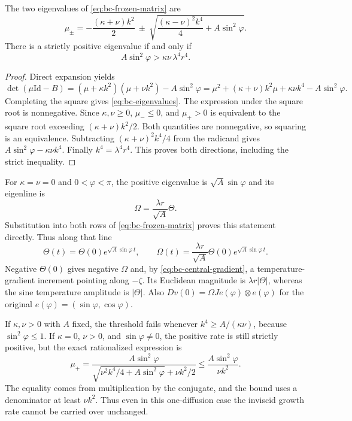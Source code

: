 \begin{proposition}
The two eigenvalues of \eqref{eq:bc-frozen-matrix} are
\begin{equation}
\mu_\pm=-\frac{(\kappa+\nu)k^2}{2}
\ \pm\
\sqrt{\frac{(\kappa-\nu)^2k^4}{4}+A\sin^2\varphi}.
\label{eq:bc-eigenvalues}
\end{equation}
There is a strictly positive eigenvalue if and only if
\begin{equation}
A\sin^2\varphi>\kappa\nu\,\lambda^4r^4.
\label{eq:bc-growth-threshold}
\end{equation}
\end{proposition}
\begin{proof}
Direct expansion yields
\[
\det(\mu\mathrm{Id}-B)
=(\mu+\kappa k^2)(\mu+\nu k^2)-A\sin^2\varphi
=\mu^2+(\kappa+\nu)k^2\mu+\kappa\nu k^4-A\sin^2\varphi.
\]
Completing the square gives \eqref{eq:bc-eigenvalues}.
The expression under the square root is nonnegative.
Since $\kappa,\nu\geq0$, $\mu_-\leq0$, and $\mu_+>0$ is equivalent
to the square root exceeding $(\kappa+\nu)k^2/2$.
Both quantities are nonnegative, so squaring is an equivalence.
Subtracting $(\kappa+\nu)^2k^4/4$ from the radicand gives
$A\sin^2\varphi-\kappa\nu k^4$. Finally $k^4=\lambda^4r^4$.
This proves both directions, including the strict inequality.
\end{proof}

For $\kappa=\nu=0$ and $0<\varphi<\pi$, the positive eigenvalue is
$\sqrt A\sin\varphi$ and its eigenline is
\[
\Omega=\frac{\lambda r}{\sqrt A}\Theta.
\]
Substitution into both rows of \eqref{eq:bc-frozen-matrix} proves
this statement directly. Thus along that line
\[
\Theta(t)=\Theta(0)e^{\sqrt A\sin\varphi\,t},\qquad
\Omega(t)=\frac{\lambda r}{\sqrt A}\Theta(0)
e^{\sqrt A\sin\varphi\,t}.
\]
Negative $\Theta(0)$ gives negative $\Omega$ and, by
\eqref{eq:bc-central-gradient}, a temperature-gradient increment
pointing along $-\zeta$. Its Euclidean magnitude is
$\lambda r|\Theta|$, whereas the sine temperature amplitude is
$|\Theta|$. Also
$Dv(0)=\Omega Je(\varphi)\otimes e(\varphi)$ for the original
$e(\varphi)=(\sin\varphi,\cos\varphi)$.

If $\kappa,\nu>0$ with $A$ fixed, the threshold fails whenever
$k^4\geq A/(\kappa\nu)$, because $\sin^2\varphi\leq1$.
If $\kappa=0$, $\nu>0$, and $\sin\varphi\ne0$, the positive rate is
still strictly positive, but the exact rationalized expression is
\[
\mu_+=
\frac{A\sin^2\varphi}
{\sqrt{\nu^2k^4/4+A\sin^2\varphi}+\nu k^2/2}
\leq \frac{A\sin^2\varphi}{\nu k^2}.
\]
The equality comes from multiplication by the conjugate, and the
bound uses a denominator at least $\nu k^2$.
Thus even in this one-diffusion case the inviscid growth rate cannot
be carried over unchanged.

